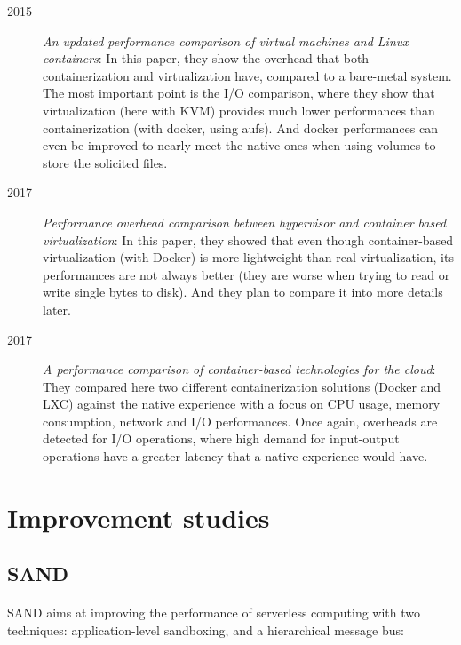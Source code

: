 \begin{description}
  \item[2015] \textit{An updated performance comparison of virtual machines and Linux containers}\cite{felter2015updated}:  In this paper, they show the overhead that both containerization and virtualization have, compared to a bare-metal system.  The most important point is the I/O comparison, where they show that virtualization (here with KVM) provides much lower performances than containerization (with docker, using aufs).  And docker performances can even be improved to nearly meet the native ones when using volumes to store the solicited files.
  
  \item[2017] \textit{Performance overhead comparison between hypervisor and container based virtualization}\cite{li2017performance}:  In this paper, they showed that even though container-based virtualization (with Docker) is more lightweight than real virtualization, its performances are not always better (they are worse when trying to read or write single bytes to disk).  And they plan to compare it into more details later.
  
  \item[2017] \textit{A performance comparison of container-based technologies for the cloud}\cite{kozhirbayev2017performance}: They compared here two different containerization solutions (Docker and LXC) against the native experience with a focus on CPU usage, memory consumption, network and I/O performances.  Once again, overheads are detected for I/O operations, where high demand for input-output operations have a greater latency that a native experience would have.
\end{description}

\section{Improvement studies}

\subsection{SAND} 
\paragraph{}SAND\cite{akkus2018sand} aims at improving the performance of serverless computing with two techniques: application-level sandboxing, and a hierarchical message bus:

